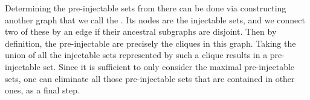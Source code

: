 Determining the pre-injectable sets from there can be done via constructing another graph that we call the . Its nodes are the injectable sets, and we connect two of these by an edge if their ancestral subgraphs are disjoint. Then by definition, the pre-injectable are precisely the cliques in this graph. Taking the union of all the injectable sets represented by such a clique results in a pre-injectable set. Since it is sufficient to only consider the maximal pre-injectable sets, one can eliminate all those pre-injectable sets that are contained in other ones, as a final step.



